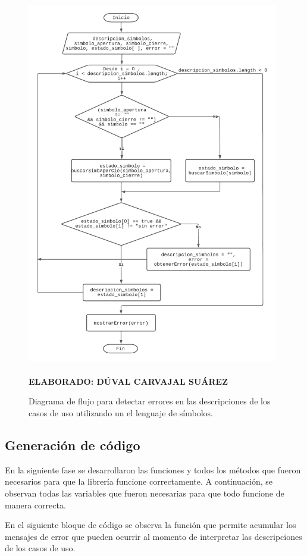 \begin{figure}[h!]
	\caption{Diagrama de flujo para detectar errores en las descripciones de los casos de uso utilizando un el lenguaje de símbolos.}
	\includegraphics[width=11cm]{img/algoritmoerror.png}
	\label{fig:algoritmoerror}
	\textbf{\\ \\ ELABORADO: DÚVAL CARVAJAL SUÁREZ}
\end{figure} 

\subsection{Generación de código}

En la siguiente fase se desarrollaron las funciones y todos los métodos que fueron necesarios para que la librería funcione correctamente. A continuación, se observan todas las variables que fueron necesarias para que todo funcione de manera correcta.
\newpage


En el siguiente bloque de código se observa la función que permite acumular los mensajes de error que pueden ocurrir al momento de interpretar las descripciones de los casos de uso. 

